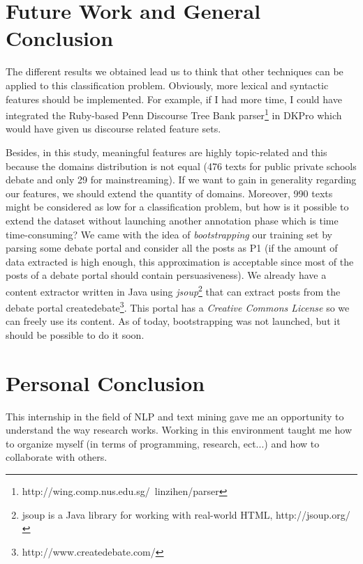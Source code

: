 \section{Future Work and General Conclusion}
The different results we obtained lead us to think that other techniques can be applied to this classification problem. Obviously, more lexical and syntactic features should be implemented. For example, if I had more time, I could have integrated the Ruby-based Penn Discourse Tree Bank\cite{NLE:9163968} parser\footnote{http://wing.comp.nus.edu.sg/~linzihen/parser} in DKPro which would have given us discourse related feature sets. 

Besides, in this study, meaningful features are highly topic-related and this because the domains distribution is not equal (476 texts for public private schools debate and only 29 for mainstreaming). If we want to gain in generality regarding our features, we should extend the quantity of domains. Moreover, 990 texts might be considered as low for a classification problem, but how is it possible to extend the dataset without launching another annotation phase which is time time-consuming? We came with the idea of \emph{bootstrapping} our training set by parsing some debate portal and consider all the posts as P1 (if the amount of data extracted is high enough, this approximation is acceptable since most of the posts of a debate portal should contain persuasiveness). We already have a content extractor written in Java using \emph{jsoup}\footnote{jsoup is a Java library for working with real-world HTML, http://jsoup.org/} that can extract posts from the debate portal createdebate\footnote{http://www.createdebate.com/}. This portal has a \emph{Creative Commons License} so we can freely use its content. As of today, bootstrapping was not launched, but it should be possible to do it soon.

\section{Personal Conclusion}
This internship in the field of NLP and text mining gave me an opportunity to understand the way research works. Working in this environment taught me how to organize myself (in terms of programming, research, ect...) and how to collaborate with others.
